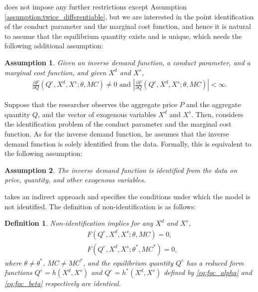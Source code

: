 \documentclass[11pt, a4paper]{article}
\newtheorem{assumption}{Assumption}
\newtheorem{definition}{Definition}
\theoremstyle{remark}
\begin{document}
\citet{lau1982identifying} does not impose any further restrictions except Assumption \ref{assumption:twice_differentiable}, but we are interested in the point identification of the conduct parameter and the marginal cost function, and hence it is natural to assume that the equilibrium quantity exists and is unique, which needs the following additional assumption:
\begin{assumption}\label{assumption:unique_equilibrium}
    Given an inverse demand function, a conduct parameter, and a marginal cost function, and given $X^{d}$ and $X^{s}$,
    \begin{align}
        \frac{\partial F}{\partial Q}(Q^{e}, X^{d}, X^{s}; \theta, MC) \ne 0 \text{ and } \left| \frac{\partial F}{\partial Q}(Q^{e}, X^{d}, X^{s}; \theta, MC)\right| < \infty. 
    \end{align}
\end{assumption}


Suppose that the researcher observes the aggregate price $P$ and the aggregate quantity $Q$, and the vector of exogenous variables $X^{d}$ and $X^{s}$.
Then, \citet{lau1982identifying} considers the identification problem of the conduct parameter and the marginal cost function.
As for the inverse demand function, he assumes that the inverse demand function is solely identified from the data.
Formally, this is equivalent to the following assumption:
\begin{assumption}\label{assumption:inverse_demand_identification}
    The inverse demand function is identified from the data on price, quantity, and other exogenous variables.
\end{assumption}




\citet{lau1982identifying} takes an indirect approach and specifies the conditions under which the model is not identified.
The definition of non-identification is as follows:
\begin{definition}\label{def:non_identification}
Non-identification implies for any $X^{d}$ and $X^{s}$,
\begin{align}
& F(Q^e, X^{d}, X^{s}; \theta, MC) = 0,  \label{eq:foc_alpha}\\
& F(Q^e, X^{d}, X^{s}; \theta^{*}, MC^{*}) = 0,\label{eq:foc_beta}
\end{align}
where $\theta \neq \theta^{*}$, $MC \ne MC^{*}$, and the equilibrium quantity $Q^e$ has a reduced form functions $Q^e = h(X^{d}, X^{s})$ and $Q^e = h^{*}(X^{d}, X^{s})$ defined by \eqref{eq:foc_alpha} and \eqref{eq:foc_beta} respectively are identical.
\end{definition}
\end{document}

